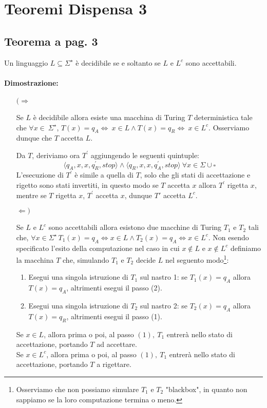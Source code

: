 \section{Teoremi Dispensa 3}

\subsection{Teorema a pag. 3}

Un linguaggio $L \subseteq \Sigma^{\star}$ è decidibile se e soltanto se $L$ e $L^{c}$ sono accettabili.

\paragraph*{Dimostrazione:}
\begin{itemize}
    \item[$(\Rightarrow$]{
        Se $L$ è decidibile allora esiste una macchina di Turing $T$ deterministica tale che $\forall x\in\ \Sigma^{\star}$, $T(x) = q_{A} \Leftrightarrow\ x\in L \land T(x) = q_{R} \Leftrightarrow\ x\in L^{c}$.
        Osserviamo dunque che $T$ accetta $L$.
        
        Da $T$, deriviamo ora $T^{'}$ aggiungendo le seguenti quintuple: 
        $$
        \langle q_{A}, x, x, q_{R}^{'}, stop \rangle \land \langle q_{R}, x, x, q_{A}^{'}, stop \rangle\ \forall x \in \Sigma \cup \square
        $$
        L'esecuzione di $T^{'}$ è simile a quella di $T$, solo che gli stati di accettazione e rigetto sono stati invertiti, in questo modo
        se $T$ accetta $x$ allora $T^{'}$ rigetta $x$, mentre se $T$ rigetta $x$, $T^{'}$ accetta $x$, dunque $T{'}$ accetta $L^{c}$.
    }
    \item[$\Leftarrow)$]{
        Se $L$ e $L^{c}$ sono accettabili allora esistono due macchine di Turing $T_{1}$ e $T_{2}$ tali che, $\forall x\in \Sigma^{\star}\, T_{1}(x) = q_{A} \Leftrightarrow x\in L \land T_{2}(x) = q_{A} \Leftrightarrow x\in L^{c}$.
        Non esendo specificato l'esito della computazione nel caso in cui $x \notin L$ e $x \notin L^{c}$ definiamo la macchina 
        $T$ che, simulando $T_{1}$ e $T_{2}$ decide $L$ nel seguento modo\footnote{Osserviamo che non possiamo simulare $T_{1}$ e $T_{2}$ "blackbox", in quanto non sappiamo se la loro computazione termina o meno.}:
        \begin{enumerate}
            \item Esegui una singola istruzione di $T_{1}$ sul nastro 1: se $T_{1}(x) = q_{A}$ allora $T(x) = q_{A}$, altrimenti esegui il passo (2).
            \item Esegui una singola istruzione di $T_{2}$ sul nastro 2: se $T_{2}(x) = q_{A}$ allora $T(x) = q_{R}$, altrimenti esegui il passo (1).
        \end{enumerate}   
        Se $x \in L$, allora prima o poi, al passo $(1),\ T_{1}$ entrerà nello stato di accettazione, portando $T$ ad accettare.\\
        Se $x \in L^{c}$, allora prima o poi, al passo $(1),\ T_{1}$ entrerà nello stato di accettazione, portando $T$ a rigettare.
    }
\end{itemize}

